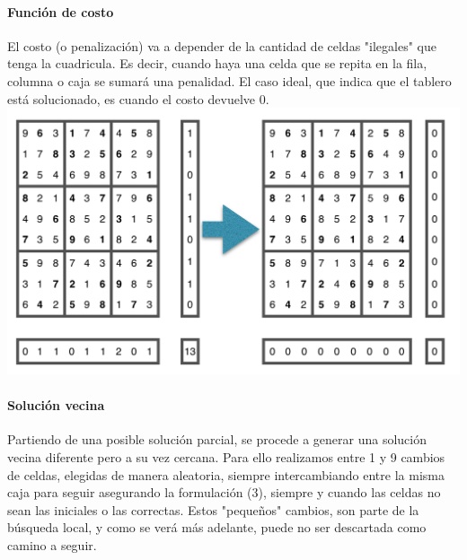 \paragraph{Función de costo}
El costo (o penalización) va a depender de la cantidad de celdas "ilegales" que tenga la cuadricula. Es decir, cuando haya una celda que se repita en la fila, columna o caja se sumará una penalidad. El caso ideal, que indica que el tablero está solucionado, es cuando el costo devuelve 0.\\
\includegraphics[scale=0.6]{imgs/costo.png}	
\paragraph{Solución vecina}
Partiendo de una posible solución parcial, se procede a generar una solución vecina diferente pero a su vez cercana. Para ello realizamos entre 1 y 9 cambios de celdas, elegidas de manera aleatoria, siempre intercambiando entre la misma caja para seguir asegurando la formulación (3), siempre y cuando las celdas no sean las iniciales o las correctas. Estos "pequeños" cambios, son parte de la búsqueda local, y como se verá más adelante, puede no ser descartada como camino a seguir.

